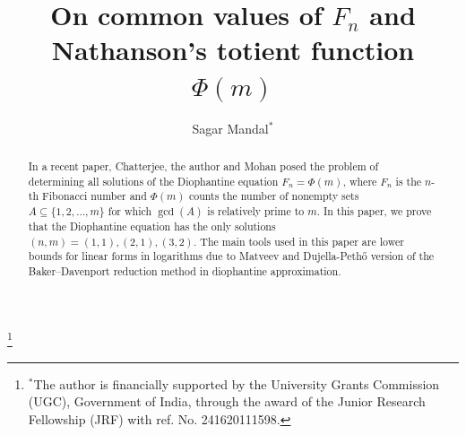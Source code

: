 \documentclass[12pt,reqno]{amsart}
\begin{document}
\title{On common values of $F_n$ and Nathanson's totient function $\Phi(m)$}

\author{Sagar Mandal$^{*}$}
\address{Department of Mathematics\\Indian Institute of Technology Ropar, Punjab, India.}
\thanks{$^{*}$The author is financially supported by the University Grants Commission (UGC), Government of India, through the award of the Junior Research Fellowship (JRF) with ref. No. 241620111598.}

\maketitle
\let\thefootnote\relax
{} %
\maketitle
{}
\let\thefootnote\relax

    \begin{abstract}
    In a recent paper, Chatterjee, the author and Mohan posed the problem of determining all solutions of the Diophantine equation $F_n=\Phi(m)$, where $F_n$ is the $n$-th Fibonacci number and $\Phi(m)$ counts the number of nonempty sets $A \subseteq \{1, 2, \dots, m\}$ for which $\gcd(A)$ is relatively prime to $m$. In this paper, we prove that the Diophantine equation has the only  solutions $(n,m)=(1,1),(2,1),(3,2)$. The main tools used in this paper are lower bounds for linear forms in logarithms due to Matveev and Dujella-Peth{\H{o}} version of the Baker–Davenport reduction method in diophantine approximation.
\end{abstract}


\end{document}
